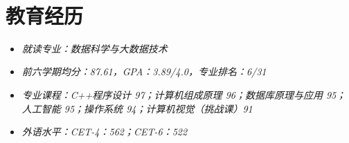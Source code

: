 \documentclass{resume}
\begin{document}



{\,}





\section{教育经历}


\begin{itemize} [parsep=1ex]
  \item \textit{就读专业：数据科学与大数据技术}
  
  \item \textit{前六学期均分：87.61，\quad{}GPA：3.89/4.0，\quad{}专业排名：6/31\quad{}}

  \item \textit{专业课程：C++程序设计 97；计算机组成原理 96；数据库原理与应用 95；\\人工智能 95；操作系统 94；计算机视觉（挑战课）91}
  
  \item \textit{外语水平：CET-4：562；CET-6：522}
\end{itemize}
\end{document}
